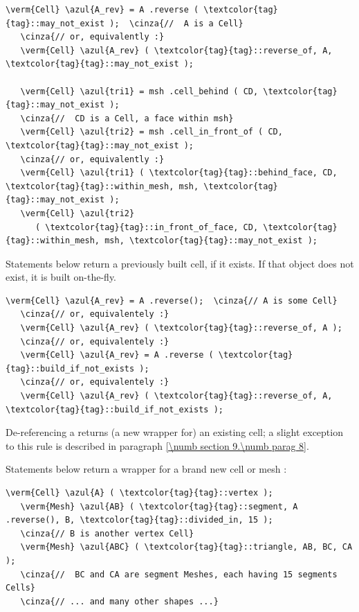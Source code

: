 \begin{Verbatim}[commandchars=\\\{\},formatcom=\small\tt,
   baselinestretch=0.94,framesep=2mm                      ]
   \verm{Cell} \azul{A_rev} = A .reverse ( \textcolor{tag}{tag}::may_not_exist );  \cinza{//  A is a Cell}
   \cinza{// or, equivalently :}
   \verm{Cell} \azul{A_rev} ( \textcolor{tag}{tag}::reverse_of, A, \textcolor{tag}{tag}::may_not_exist );
   
   \verm{Cell} \azul{tri1} = msh .cell_behind ( CD, \textcolor{tag}{tag}::may_not_exist );
   \cinza{//  CD is a Cell, a face within msh}
   \verm{Cell} \azul{tri2} = msh .cell_in_front_of ( CD, \textcolor{tag}{tag}::may_not_exist );
   \cinza{// or, equivalently :}
   \verm{Cell} \azul{tri1} ( \textcolor{tag}{tag}::behind_face, CD, \textcolor{tag}{tag}::within_mesh, msh, \textcolor{tag}{tag}::may_not_exist );
   \verm{Cell} \azul{tri2}
      ( \textcolor{tag}{tag}::in_front_of_face, CD, \textcolor{tag}{tag}::within_mesh, msh, \textcolor{tag}{tag}::may_not_exist );
\end{Verbatim}

Statements below return a previously built cell, if it exists.
If that object does not exist, it is built on-the-fly.

\begin{Verbatim}[commandchars=\\\{\},formatcom=\small\tt,
   baselinestretch=0.94,framesep=2mm                      ]
   \verm{Cell} \azul{A_rev} = A .reverse();  \cinza{// A is some Cell}
   \cinza{// or, equivalentely :}
   \verm{Cell} \azul{A_rev} ( \textcolor{tag}{tag}::reverse_of, A );
   \cinza{// or, equivalentely :}
   \verm{Cell} \azul{A_rev} = A .reverse ( \textcolor{tag}{tag}::build_if_not_exists );
   \cinza{// or, equivalentely :}
   \verm{Cell} \azul{A_rev} ( \textcolor{tag}{tag}::reverse_of, A, \textcolor{tag}{tag}::build_if_not_exists );
\end{Verbatim}

De-referencing a {\small\tt{}} returns (a new wrapper for) an existing cell;
a slight exception to this rule is described in paragraph \ref{\numb section 9.\numb parag 8}.

Statements below return a wrapper for a brand new cell or mesh :

\begin{Verbatim}[commandchars=\\\{\},formatcom=\small\tt,
   baselinestretch=0.94,framesep=2mm                      ]
   \verm{Cell} \azul{A} ( \textcolor{tag}{tag}::vertex );
   \verm{Mesh} \azul{AB} ( \textcolor{tag}{tag}::segment, A .reverse(), B, \textcolor{tag}{tag}::divided_in, 15 );
   \cinza{// B is another vertex Cell}
   \verm{Mesh} \azul{ABC} ( \textcolor{tag}{tag}::triangle, AB, BC, CA );
   \cinza{//  BC and CA are segment Meshes, each having 15 segments Cells}
   \cinza{// ... and many other shapes ...}
\end{Verbatim}



